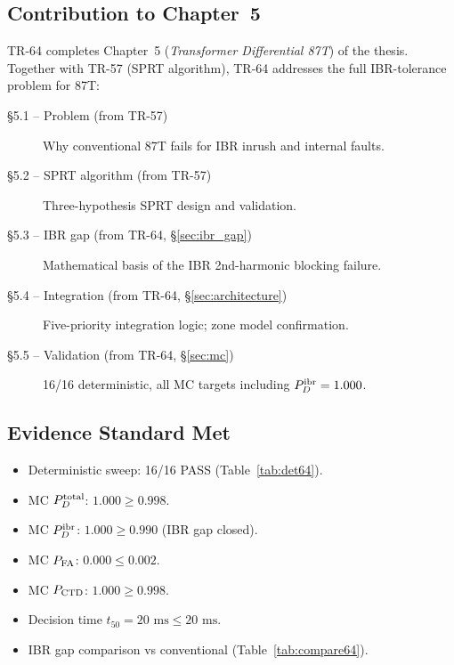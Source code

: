\documentclass[11pt, a4paper]{article}
\newcommand{\ms}{\,\text{ms}}
\begin{document}
\subsection{Contribution to Chapter~5}

TR-64 completes Chapter~5 (\emph{Transformer Differential 87T}) of the
thesis.  Together with TR-57 (SPRT algorithm), TR-64 addresses the full
IBR-tolerance problem for 87T:

\begin{description}
  \item[§5.1 -- Problem (from TR-57)] Why conventional 87T fails for IBR inrush
    and internal faults.
  \item[§5.2 -- SPRT algorithm (from TR-57)] Three-hypothesis SPRT design and
    validation.
  \item[§5.3 -- IBR gap (from TR-64, §\ref{sec:ibr_gap})] Mathematical basis of
    the IBR 2nd-harmonic blocking failure.
  \item[§5.4 -- Integration (from TR-64, §\ref{sec:architecture})] Five-priority
    integration logic; zone model confirmation.
  \item[§5.5 -- Validation (from TR-64, §\ref{sec:mc})] 16/16 deterministic,
    all MC targets including $P_D^{\rm ibr} = 1.000$.
\end{description}

\subsection{Evidence Standard Met}

\begin{itemize}
  \item[$\checkmark$] Deterministic sweep: 16/16 PASS (Table~\ref{tab:det64}).
  \item[$\checkmark$] MC $P_D^{\rm total}$: $1.000 \geq 0.998$.
  \item[$\checkmark$] MC $P_D^{\rm ibr}$: $1.000 \geq 0.990$ (IBR gap closed).
  \item[$\checkmark$] MC $P_{\rm FA}$: $0.000 \leq 0.002$.
  \item[$\checkmark$] MC $P_{\rm CTD}$: $1.000 \geq 0.998$.
  \item[$\checkmark$] Decision time $t_{50} = 20\,\ms \leq 20\,\ms$.
  \item[$\checkmark$] IBR gap comparison vs conventional (Table~\ref{tab:compare64}).
\end{itemize}


\end{document}
